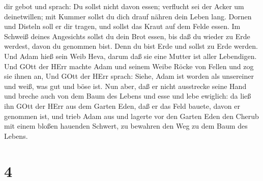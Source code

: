 dir gebot und sprach: Du sollst nicht davon essen; verflucht sei der
Acker um deinetwillen; mit Kummer sollst du dich drauf nähren dein Leben
lang.  Dornen und Disteln soll er dir tragen, und sollst
das Kraut auf dem Felde essen.  Im Schweiß deines
Angesichts sollst du dein Brot essen, bis daß du wieder zu Erde werdest,
davon du genommen bist. Denn du bist Erde und sollst zu Erde werden.
 Und Adam hieß sein Weib Heva, darum daß sie eine Mutter
ist aller Lebendigen.  Und GOtt der HErr machte Adam und
seinem Weibe Röcke von Fellen und zog sie ihnen an,  Und
GOtt der HErr sprach: Siehe, Adam ist worden als unsereiner und weiß,
was gut und böse ist. Nun aber, daß er nicht ausstrecke seine Hand und
breche auch von dem Baum des Lebens und esse und lebe ewiglich:
 da ließ ihn GOtt der HErr aus dem Garten Eden, daß er das
Feld bauete, davon er genommen ist,  und trieb Adam aus und
lagerte vor den Garten Eden den Cherub mit einem bloßen hauenden
Schwert, zu bewahren den Weg zu dem Baum des Lebens.

\hypertarget{section-3}{%
\section{4}\label{section-3}}

